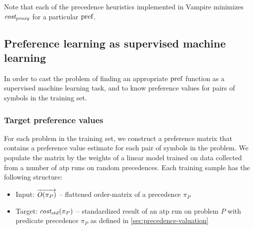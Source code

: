 Note that each of the precedence heuristics implemented in Vampire minimizes \(\operatorname{\mathit{cost_{proxy}}}\)
for a particular \(\operatorname{pref}\).

\subsection{Preference learning as supervised machine learning}

In order to cast the problem of finding an appropriate \(\operatorname{pref}\) function
as a supervised machine learning task,
and to know preference values for pairs of symbols in the training set.

\subsubsection{Target preference values}

For each problem in the training set, we construct a preference matrix that contains a preference
value estimate for each pair of symbols in the problem.
We populate the matrix by the weights of a linear model trained on data
collected from a number of \gls{atp} runs on random precedences.
Each training sample has the following structure:

\begin{itemize}
	\item Input: \(\overrightarrow{\operatorname{\mathit{O}}(\pi_P)}\) --
	flattened \gls{order-matrix} of a precedence \(\pi_P\)
	\item Target: \(\operatorname{\mathit{cost_{std}}}(\pi_P)\) --
	standardized result of an \gls{atp} run on problem \(P\) with predicate precedence \(\pi_P\)
	as defined in \autoref{sec:precedence-valuation}
\end{itemize}

